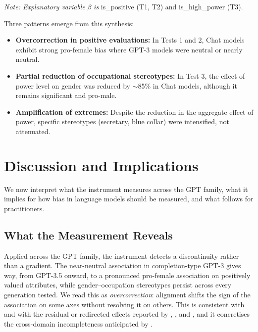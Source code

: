\documentclass[jair,11pt,letterpaper]{article}
\begin{document}
\textit{Note: Explanatory variable} $\beta$ \textit{is} is\_positive (T1, T2) and is\_high\_power
(T3).

Three patterns emerge from this synthesis:

\begin{itemize}
\item \textbf{Overcorrection in positive evaluations:} In Tests 1 and 2, Chat models exhibit strong pro-female bias where GPT-3 models were neutral or nearly neutral.

\item \textbf{Partial reduction of occupational stereotypes:} In Test 3, the effect of power level on gender was reduced by $\sim$85\% in Chat models, although it remains significant and pro-male.

\item \textbf{Amplification of extremes:} Despite the reduction in the aggregate effect of power, specific stereotypes (secretary, blue collar) were intensified, not attenuated.
\end{itemize}




\section{Discussion and Implications}
\label{sec:discussion}

We now interpret what the instrument measures across the GPT family, what it implies
for how bias in language models should be measured, and what follows for practitioners.

\subsection{What the Measurement Reveals}
Applied across the GPT family, the instrument detects a discontinuity rather
than a gradient. The near-neutral association in completion-type GPT-3 gives
way, from GPT-3.5 onward, to a pronounced pro-female association on positively
valued attributes, while gender--occupation stereotypes persist across every
generation tested. We read this as \emph{overcorrection}: alignment shifts the
sign of the association on some axes without resolving it on others. This is
consistent with  and with the residual or redirected effects
reported by , , and , and
it concretises the cross-domain incompleteness anticipated by .
\end{document}
